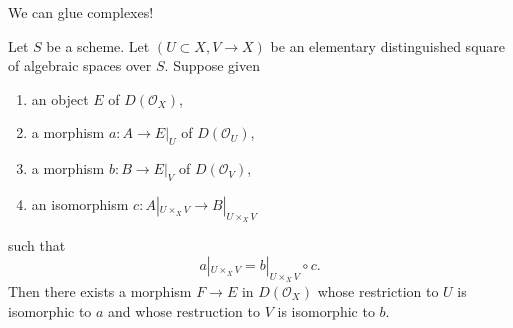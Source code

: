 \noindent
We can glue complexes!

\begin{lemma}
\label{lemma-glue}
Let $S$ be a scheme. Let $(U \subset X, V \to X)$ be an elementary
distinguished square of algebraic spaces over $S$. Suppose given
\begin{enumerate}
\item an object $E$ of $D(\mathcal{O}_X)$,
\item a morphism $a : A \to E|_U$ of $D(\mathcal{O}_U)$,
\item a morphism $b : B \to E|_V$ of $D(\mathcal{O}_V)$,
\item an isomorphism $c : A|_{U \times_X V} \to B|_{U \times_X V}$
\end{enumerate}
such that
$$
a|_{U \times_X V}  = b|_{U \times_X V} \circ c.
$$
Then there exists a morphism $F \to E$ in $D(\mathcal{O}_X)$
whose restriction to $U$ is isomorphic to $a$
and whose restruction to $V$ is isomorphic to $b$.
\end{lemma}

